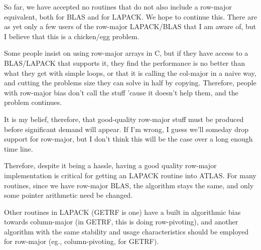 \documentclass[11pt]{article}
\begin{document}
So far, we have accepted no routines that do not also include a row-major
equivalent, both for BLAS and for LAPACK.  We hope to continue this.  There
are as yet only a few users of the row-major LAPACK/BLAS that I am aware of,
but I believe that this is a chicken/egg problem.

Some people insist on using row-major arrays in C, but if they have access
to a BLAS/LAPACK that supports it, they find the performance is no better
than what they get with simple loops, or that it is calling the col-major
in a naive way, and cutting the problems size they can solve in half by
copying.  Therefore, people with row-major bias don't call the stuff 'cause
it doesn't help them, and the problem continues.

It is my belief, therefore, that good-quality row-major stuff must be
produced before significant demand will appear.  If I'm wrong, I guess
we'll someday drop support for row-major, but I don't think this will be
the case over a long enough time line.

Therefore, despite it being a hassle, having a good quality row-major
implementation is critical for getting an LAPACK routine into ATLAS.
For many routines, since we have row-major BLAS, the algorithm stays
the same, and only some pointer arithmetic need be changed.

Other routines in LAPACK (GETRF is one) have a built in algorithmic bias
towards column-major (in GETRF, this is doing row-pivoting), and another
algorithm with the same stability and usage characteristics should be
employed for row-major (eg., column-pivoting, for GETRF).
\end{document}
